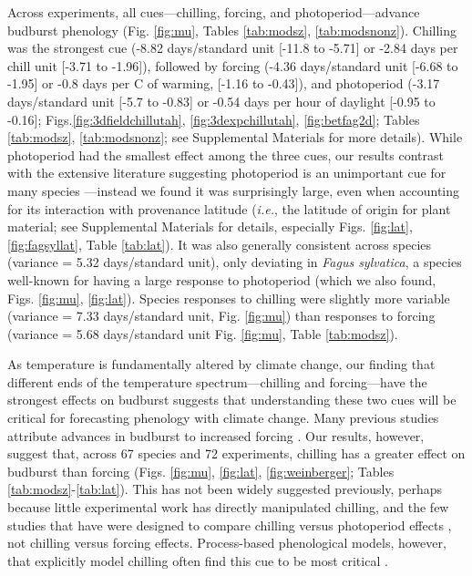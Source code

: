 \documentclass{article}
\newcommand{\R}[1]{\label{#1}\linelabel{#1}}
\begin{document}
\par Across experiments\R{ee5}, all cues---chilling, forcing, and photoperiod---advance budburst phenology (Fig. \ref{fig:mu}, Tables \ref{tab:modsz}, \ref{tab:modsnonz}). Chilling was the strongest cue (-8.82 days/standard unit [-11.8 to -5.71] or -2.84 days per chill unit [-3.71 to -1.96]), followed by forcing (-4.36 days/standard unit [-6.68 to -1.95] or -0.8 days per \degree C of warming, [-1.16 to -0.43]), and photoperiod (-3.17 days/standard unit [-5.7 to -0.83] or -0.54 days per hour of daylight [-0.95 to  -0.16]; Figs.\ref{fig:3dfieldchillutah}, \ref{fig:3dexpchillutah}, \ref{fig:betfag2d}; Tables \ref{tab:modsz}, \ref{tab:modsnonz}; see Supplemental Materials for more details). While photoperiod had the smallest effect among the three cues, our results contrast with the extensive literature suggesting photoperiod is an unimportant cue for many species \emph{\citep{zohner2016,fu2019}}---instead we found it was surprisingly large, even when accounting for its interaction with provenance latitude (\emph{i.e.}, the latitude of origin for plant material; see Supplemental Materials for details, especially Figs. \ref{fig:lat}, \ref{fig:fagsyllat}, Table \ref{tab:lat}). It was also generally consistent across species (variance = 5.32 days/standard unit), only deviating in \emph{Fagus sylvatica}, a species well-known for having a large response to photoperiod (which we also found, Figs. \ref{fig:mu}, \ref{fig:lat}). Species responses to chilling were slightly more variable (variance = 7.33 days/standard unit, Fig. \ref{fig:mu}) than responses to forcing (variance = 5.68 days/standard unit Fig. \ref{fig:mu}, Table \ref{tab:modsz}). 

\par As temperature is fundamentally altered by climate change, our finding that different ends of the temperature spectrum---chilling and forcing---have the strongest effects on budburst suggests that understanding these two cues will be critical for forecasting phenology with climate change. Many previous studies attribute advances in budburst to increased forcing \emph{\citep{menzel2006,harrington2015,Basler:2014aa,bradley1999}}. Our results, however, suggest that, across 67 species and 72 experiments\R{ee6}, chilling has a greater effect on budburst than forcing (Figs. \ref{fig:mu}, \ref{fig:lat}, \ref{fig:weinberger}; Tables \ref{tab:modsz}-\ref{tab:lat}). \R{eeXstart}This has not been widely suggested previously, perhaps because little experimental work has directly manipulated chilling, and the few studies that have were designed to compare chilling versus photoperiod effects \emph{\citep[e.g.,][]{zohner2016,Basler:2014aa,Caffarra:2011qf,Laube:2014a}}, not chilling versus forcing effects. Process-based phenological models, however, that explicitly model chilling often find this cue to be most critical \emph{\citep[e.g.,][]{gauzere2019,Laube:2014a,Heide:2005aa}}.\R{eeXend}
\end{document}
